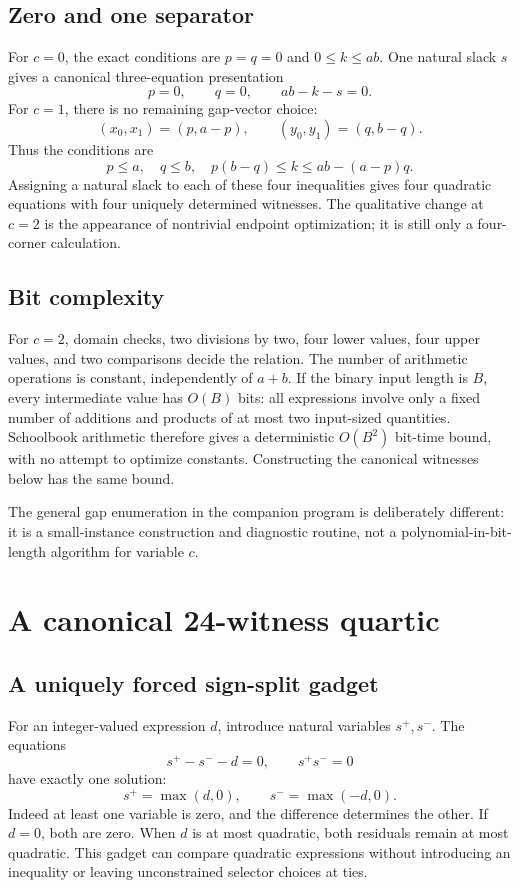 \documentclass[11pt,letterpaper]{article}
\theoremstyle{definition}
\theoremstyle{remark}
\begin{document}
\subsection{Zero and one separator}
For $c=0$, the exact conditions are $p=q=0$ and $0\le k\le ab$. One natural slack $s$ gives a canonical three-equation presentation
\[
 p=0,\qquad q=0,\qquad ab-k-s=0.
\]
For $c=1$, there is no remaining gap-vector choice:
\[
 (x_0,x_1)=(p,a-p),\qquad (y_0,y_1)=(q,b-q).
\]
Thus the conditions are
\begin{equation}\label{gts:po:eq:c1}
 p\le a,\quad q\le b,\quad
 p(b-q)\le k\le ab-(a-p)q.
\end{equation}
Assigning a natural slack to each of these four inequalities gives four quadratic equations with four uniquely determined witnesses. The qualitative change at $c=2$ is the appearance of nontrivial endpoint optimization; it is still only a four-corner calculation.

\subsection{Bit complexity}
For $c=2$, domain checks, two divisions by two, four lower values, four upper values, and two comparisons decide the relation. The number of arithmetic operations is constant, independently of $a+b$. If the binary input length is $B$, every intermediate value has $O(B)$ bits: all expressions involve only a fixed number of additions and products of at most two input-sized quantities. Schoolbook arithmetic therefore gives a deterministic $O(B^2)$ bit-time bound, with no attempt to optimize constants. Constructing the canonical witnesses below has the same bound.

The general gap enumeration in the companion program is deliberately different: it is a small-instance construction and diagnostic routine, not a polynomial-in-bit-length algorithm for variable $c$.

\section{A canonical 24-witness quartic}
\subsection{A uniquely forced sign-split gadget}
For an integer-valued expression $d$, introduce natural variables $s^+,s^-$. The equations
\begin{equation}\label{gts:po:eq:split}
 s^+-s^--d=0,\qquad s^+s^-=0
\end{equation}
have exactly one solution:
\[
 s^+=\max(d,0),\qquad s^-=\max(-d,0).
\]
Indeed at least one variable is zero, and the difference determines the other. If $d=0$, both are zero. When $d$ is at most quadratic, both residuals remain at most quadratic. This gadget can compare quadratic expressions without introducing an inequality or leaving unconstrained selector choices at ties.
\end{document}
